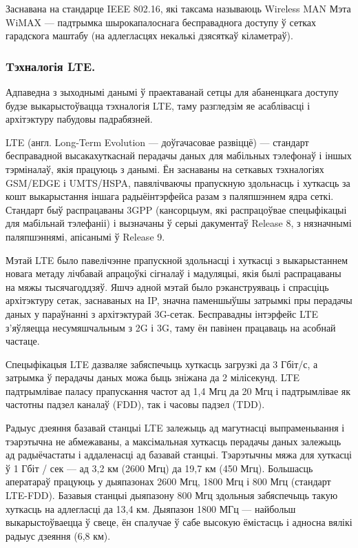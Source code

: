 Заснавана на стандарце IEEE 802.16, які таксама называюць Wireless MAN
Мэта WiMAX --- падтрымка шырокапалоснага бесправаднога доступу ў сетках гарадскога маштабу (на адлегласцях некалькі дзясяткаў кіламетраў).

\subsubsection{Tэхналогія LTE.}

Адпаведна з зыходнымі данымі ў праектаванай сетцы для абаненцкага
доступу будзе выкарыстоўвацца тэхналогія LTE, таму разгледзім яе
асаблівасці і архітэктуру пабудовы падрабязней.

LTE (англ. Long-Term Evolution --- доўгачасовае развіццё) --- стандарт бесправадной высакахуткаснай перадачы даных для мабільных тэлефонаў і іншых тэрміналаў, якія працуюць з данымі. Ён заснаваны на сеткавых тэхналогіях GSM/EDGE і UMTS/HSPA, павялічваючы прапускную здольнасць і хуткасць за кошт выкарыстання іншага радыёінтэрфейса разам з паляпшэннем ядра сеткі. Стандарт быў распрацаваны 3GPP (кансорцыум, які распрацоўвае спецыфікацыі для мабільнай тэлефаніі) і вызначаны ў серыі дакументаў Release 8, з нязначнымі паляпшэннямі, апісанымі ў Release 9.

Мэтай LTE было павелічэнне прапускной здольнасці і хуткасці з выкарыстаннем новага метаду лічбавай апрацоўкі сігналаў і мадуляцыі, якія былі распрацаваны на мяжы тысячагоддзяў. Яшчэ адной мэтай было рэканструяваць і спрасціць архітэктуру сетак, заснаваных на IP, значна паменшыўшы затрымкі пры перадачы даных у параўнанні з архітэктурай 3G-сетак. Бесправадны інтэрфейс LTE з'яўляецца несумяшчальным з 2G і 3G, таму ён павінен працаваць на асобнай частаце.

Спецыфікацыя LTE дазваляе забяспечыць хуткасць загрузкі да 3 Гбіт/с, а затрымка ў перадачы даных можа быць зніжана да 2 мілісекунд. LTE падтрымлівае паласу прапускання частот ад 1,4 Мгц да 20 Мгц і падтрымлівае як частотны падзел каналаў (FDD), так і часовы падзел (TDD).

Радыус дзеяння базавай станцыі LTE залежыць ад магутнасці выпраменьвання і тэарэтычна не абмежаваны, а максімальная хуткасць перадачы даных залежыць ад радыёчастаты і аддаленасці ад базавай станцыі. Тэарэтычны мяжа для хуткасці ў 1 Гбіт / сек --- ад 3,2 км (2600 Мгц) да 19,7 км (450 Мгц). Большасць аператараў працуюць у дыяпазонах 2600 Мгц, 1800 Мгц і 800 Мгц (стандарт LTE-FDD). Базавыя станцыі дыяпазону 800 Мгц здольныя забяспечыць такую хуткасць на адлегласці да 13,4 км. Дыяпазон 1800 МГц --- найбольш выкарыстоўваецца ў свеце, ён спалучае ў сабе высокую ёмістасць і адносна вялікі радыус дзеяння (6,8 км).

